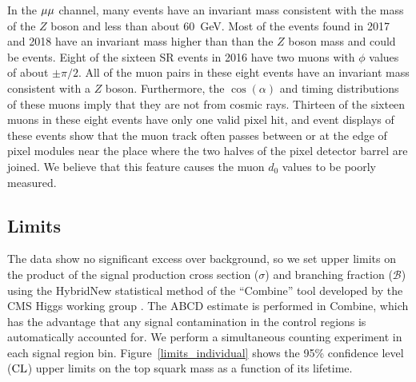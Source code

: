 In the ${\mu}{\mu}$ channel, many events have an invariant mass consistent with the mass of the $Z$ boson and \ptmiss less than about \SI{60}{\GeV}. Most of the events found in 2017 and 2018 have an invariant mass higher than than the $Z$ boson mass and could be \ttbar events. Eight of the sixteen SR events in 2016 have two muons with $\phi$ values of about $\pm\pi/2$. All of the muon pairs in these eight events have an invariant mass consistent with a $Z$ boson. Furthermore, the $\cos(\alpha)$ and timing distributions of these muons imply that they are not from cosmic rays. Thirteen of the sixteen muons in these eight events have only one valid pixel hit, and event displays of these events show that the muon track often passes between or at the edge of pixel modules near the place where the two halves of the pixel detector barrel are joined. We believe that this feature causes the muon $d_0$ values to be poorly measured.

\subsection{Limits}

The data show no significant excess over background, so we set upper limits on the product of the signal production cross section ($\sigma$) and branching fraction ($\mathcal{B}$) using the HybridNew statistical method of the ``Combine'' tool developed by the CMS Higgs working group \cite{Junk_CLS,Read_CLS,Cowan:2010js,CMS-NOTE-2011-005}. The ABCD estimate is performed in Combine, which has the advantage that any signal contamination in the control regions is automatically accounted for. We perform a simultaneous counting experiment in each signal region bin. Figure~\ref{limits_individual} shows the 95\% confidence level ($\text{CL}$) upper limits on the top squark mass as a function of its lifetime.

